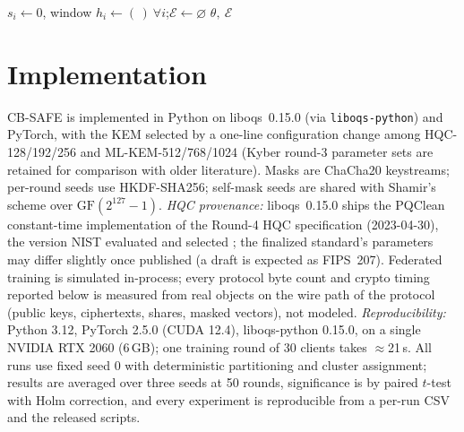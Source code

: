 \documentclass[lettersize,journal]{IEEEtran}
\begin{document}
\begin{algorithm}[t]
\caption{CB-SAFE+: Temporal Group Testing over Cluster Sums}
\label{alg:cbsafeplus}
\DontPrintSemicolon
{}
$s_i \leftarrow 0$, window $h_i \leftarrow (\,)\ \forall i$;\quad $\mathcal{E}\leftarrow\varnothing$\;
\Return $\theta,\ \mathcal{E}$\;
\end{algorithm}

\section{Implementation}
CB-SAFE is implemented in Python on liboqs~0.15.0 (via \texttt{liboqs-python}) and
PyTorch, with the KEM selected by a one-line configuration change among HQC-128/192/256
and ML-KEM-512/768/1024 (Kyber round-3 parameter sets are retained for comparison
with older literature). Masks are ChaCha20 keystreams; per-round seeds use
HKDF-SHA256; self-mask seeds are shared with Shamir's scheme over
$\mathrm{GF}(2^{127}-1)$. \emph{HQC provenance:} liboqs~0.15.0 ships the PQClean
constant-time implementation of the Round-4 HQC specification (2023-04-30), the
version NIST evaluated and selected \cite{nistir8545}; the finalized standard's
parameters may differ slightly once published (a draft is expected as FIPS~207).
Federated training is simulated in-process; every protocol byte count and crypto
timing reported below is measured from real objects on the wire path of the
protocol (public keys, ciphertexts, shares, masked vectors), not modeled.
\emph{Reproducibility:} Python 3.12, PyTorch 2.5.0 (CUDA 12.4), liboqs-python
0.15.0, on a single NVIDIA RTX 2060 (6\,GB); one training round of 30 clients takes
$\approx$21\,s. All runs use fixed seed 0 with deterministic partitioning and
cluster assignment; results are averaged over three seeds at 50 rounds,
significance is by paired $t$-test with Holm correction,
and every experiment is reproducible from a per-run CSV and the released scripts.
\end{document}
